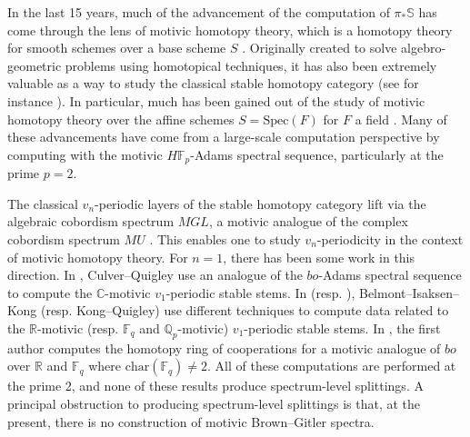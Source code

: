 \documentclass{amsart}
\theoremstyle{plain}
\numberwithin{theorem}{section}
\numberwithin{equation}{section}
\numberwithin{figure}{section}
\newcommand{\0}{\langle 0 \rangle }
\begin{document}
In the last 15 years, much of the advancement of the computation of $\pi_*\mathbb{S}$ has come through the lens of motivic homotopy theory, which is a homotopy theory for smooth schemes over a base scheme $S$ \cite{VoeA1, Mor12}. Originally created to solve algebro-geometric problems using homotopical techniques, it has also been extremely valuable as a way to study the classical stable homotopy category (see for instance \cite{Pst23}). In particular, much has been gained out of the study of motivic homotopy theory over the affine schemes $S=\text{Spec}(F)$ for $F$ a field \cite{IsaWanXu23,BacBurXu25}. Many of these advancements have come from a large-scale computation perspective by computing with the motivic $H\mathbb{F}_p$-Adams spectral sequence, particularly at the prime $p=2$.

The classical $v_n$-periodic layers of the stable homotopy category lift via the algebraic cobordism spectrum $MGL$, a motivic analogue of the complex cobordism spectrum $MU$ \cite{LM07}. This enables one to study $v_n$-periodicity in the context of motivic homotopy theory. For $n=1$, there has been some work in this direction. In \cite{CQ21}, Culver--Quigley use an analogue of the $bo$-Adams spectral sequence to compute the $\mathbb{C}$-motivic $v_1$-periodic stable stems. In \cite{belmontisaksenkong-v1R} (resp. \cite{kongquigley}), Belmont--Isaksen--Kong (resp. Kong--Quigley) use different techniques to compute data related to the $\mathbb{R}$-motivic (resp. $\mathbb{F}_q$ and $\mathbb{Q}_p$-motivic) $v_1$-periodic stable stems. In \cite{Realkqcoop,finitekqcoop}, the first author computes the homotopy ring of cooperations for a motivic analogue of $bo$ over $\mathbb{R}$ and $\mathbb{F}_q$ where $\text{char}(\mathbb{F}_q) \neq 2$. All of these computations are performed at the prime 2, and none of these results produce spectrum-level splittings. A principal obstruction to producing spectrum-level splittings is that, at the present, there is no construction of motivic Brown--Gitler spectra.
\end{document}
